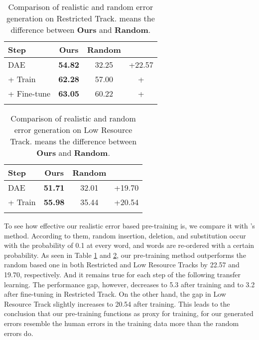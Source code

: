 \documentclass[11pt,a4paper]{article}
\begin{document}
\begin{table}
\centering
\begin{tabular}{l>{\bfseries}ccc}
\Xhline{1.1pt}
\textbf{Step} & \textbf{Ours} & \textbf{Random} & \textbf{} \\
\hline
DAE     & 54.82 & 32.25 & +22.57 \\
+ Train & 62.28 & 57.00 & +\; 5.28 \\
+ Fine-tune & 63.05 & 60.22 & +\; 2.83 \\
\Xhline{1.1pt}
\end{tabular}

\caption{Comparison of realistic and random error generation on Restricted Track.  means the difference between \textbf{Ours} and \textbf{Random}.}
\label{tbl:random-track1}
\end{table}


\begin{table}
\centering


\begin{tabular}{l>{\bfseries}ccc}
\Xhline{1.1pt}
\textbf{Step} & \textbf{Ours} & \textbf{Random} &  \\
\hline
DAE & 51.71 & 32.01 & +19.70 \\
+ Train & 55.98 & 35.44 & +20.54 \\
\Xhline{1.1pt}
\end{tabular}

\caption{Comparison of realistic and random error generation on Low Resource Track.  means the difference between \textbf{Ours} and \textbf{Random}.}
\label{tbl:random-track3}
\end{table}


To see how effective our realistic error based pre-training is, we compare it with \cite{zhao2019improving}'s method.
According to them, random insertion, deletion, and substitution occur with the probability of 0.1 at every word, and words are re-ordered with a certain probability.
As seen in Table \ref{tbl:random-track1} and \ref{tbl:random-track3}, our pre-training method outperforms the random based one in both Restricted and Low Resource Tracks by 22.57 and 19.70, respectively.
And it remains true for each step of the following transfer learning.
The performance gap, however, decreases to 5.3 after training and to 3.2 after fine-tuning in Restricted Track.
On the other hand, the gap in Low Resource Track slightly increases to 20.54 after training.
This leads to the conclusion that our pre-training functions as proxy for training, for our generated errors resemble the human errors in the training data more than the random errors do.
\end{document}
